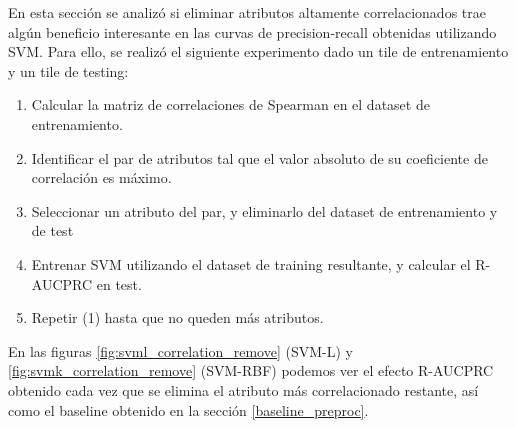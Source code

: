 En esta sección se analizó si eliminar atributos altamente correlacionados trae algún beneficio interesante en las curvas de precision-recall obtenidas utilizando SVM. Para ello, se realizó el siguiente experimento dado un tile de entrenamiento y un tile de testing:

\begin{enumerate}
\item Calcular la matriz de correlaciones de Spearman en el dataset de entrenamiento.
\item Identificar el par de atributos tal que el valor absoluto de su coeficiente de correlación es máximo.
\item Seleccionar un atributo del par, y eliminarlo del dataset de entrenamiento y de test
\item Entrenar SVM utilizando el dataset de training resultante, y calcular el R-AUCPRC en test.
\item Repetir (1) hasta que no queden más atributos.
\end{enumerate}

En las figuras \ref{fig:svml_correlation_remove} (SVM-L) y \ref{fig:svmk_correlation_remove} (SVM-RBF) podemos ver el efecto R-AUCPRC obtenido cada vez que se elimina el atributo más correlacionado restante, así como el baseline obtenido en la sección \ref{baseline_preproc}.

